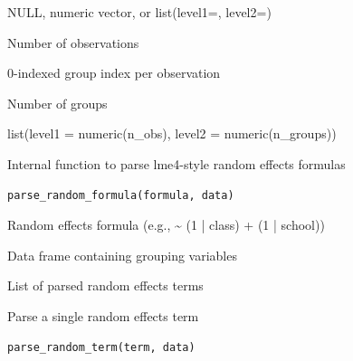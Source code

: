 \documentclass[a4paper]{book}
\begin{document}
%
\begin{Arguments}
\begin{ldescription}
\item[\code{weights}] NULL, numeric vector, or list(level1=, level2=)

\item[\code{n\_obs}] Number of observations

\item[\code{groups}] 0-indexed group index per observation

\item[\code{n\_groups}] Number of groups
\end{ldescription}
\end{Arguments}
%
\begin{Value}
list(level1 = numeric(n\_obs), level2 = numeric(n\_groups))
\end{Value}
%
\begin{Description}
Internal function to parse lme4-style random effects formulas
\end{Description}
%
\begin{Usage}
\begin{verbatim}
parse_random_formula(formula, data)
\end{verbatim}
\end{Usage}
%
\begin{Arguments}
\begin{ldescription}
\item[\code{formula}] Random effects formula (e.g., \textasciitilde{} (1 | class) + (1 | school))

\item[\code{data}] Data frame containing grouping variables
\end{ldescription}
\end{Arguments}
%
\begin{Value}
List of parsed random effects terms
\end{Value}
%
\begin{Description}
Parse a single random effects term
\end{Description}
%
\begin{Usage}
\begin{verbatim}
parse_random_term(term, data)
\end{verbatim}
\end{Usage}
\end{document}
